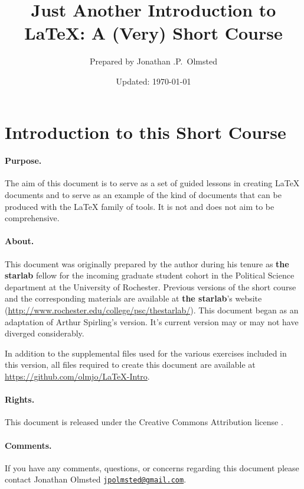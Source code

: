 \documentclass[10pt,letterpaper]{article}
\author{Prepared by Jonathan .P.\ Olmsted}
\title{Just Another Introduction to \LaTeX{}: A (Very) Short Course}
\date{Updated: \today}
\newcommand{\tsl}{\textbf{\textsf{the starlab}}}
\begin{document}
\begin{titlepage}
  \maketitle
\end{titlepage}

\section*{Introduction to this Short Course}

\paragraph{Purpose.} The aim of this document is to serve as a set of guided
lessons in creating \LaTeX{} documents and to serve as an example of the kind of
documents that can be produced with the \LaTeX{} family of tools. It is not and
does not aim to be comprehensive.

\paragraph{About.} This document was originally prepared by the author during
his tenure as \tsl{} fellow for the incoming graduate student cohort in the
Political Science department at the University of Rochester. Previous versions
of the short course and the corresponding materials are available at \tsl{}'s
website (\url{http://www.rochester.edu/college/psc/thestarlab/}). This document
began as an adaptation of Arthur Spirling's version. It's current version may or
may not have diverged considerably.

In addition to the supplemental files used for the various exercises included in
this version, all files required to create this document are available at
\url{https://github.com/olmjo/LaTeX-Intro}.

\paragraph{Rights.}This document is released under the Creative
Commons Attribution license \by{}.

\paragraph{Comments.}If you have any comments, questions, or concerns regarding
this document please contact Jonathan Olmsted
\href{mailto:jpolmsted@gmail.com}{\texttt{jpolmsted@gmail.com}}.
\end{document}
